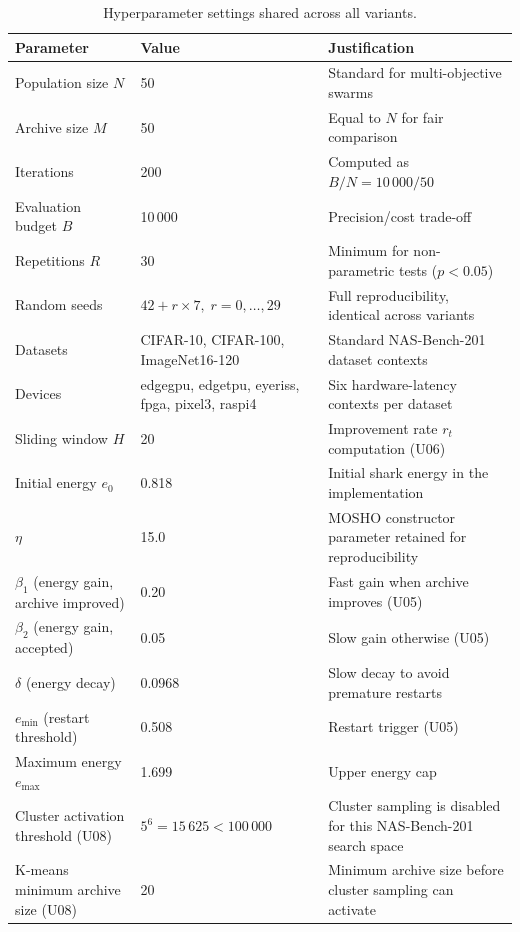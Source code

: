 \documentclass[11pt,a4paper]{article}
\begin{document}
\begin{table}[H]
\centering
\caption{Hyperparameter settings shared across all variants.}
\label{tab:params}
\renewcommand{\arraystretch}{1.2}
\begin{tabularx}{\linewidth}{l l X}
\toprule
\textbf{Parameter} & \textbf{Value} & \textbf{Justification} \\
\midrule
Population size $N$           & 50
  & Standard for multi-objective swarms \\
Archive size $M$              & 50
  & Equal to $N$ for fair comparison \\
Iterations                    & 200
  & Computed as $B/N = 10\,000/50$ \\
Evaluation budget $B$         & 10\,000
  & Precision/cost trade-off \\
Repetitions $R$               & 30
  & Minimum for non-parametric tests ($p < 0.05$) \\
Random seeds & $42 + r \times 7,\; r=0,\dots,29$
  & Full reproducibility, identical across variants \\
Datasets & CIFAR-10, CIFAR-100, ImageNet16-120
  & Standard NAS-Bench-201 dataset contexts \\
Devices & edgegpu, edgetpu, eyeriss, fpga, pixel3, raspi4
  & Six hardware-latency contexts per dataset \\
Sliding window $H$            & 20
  & Improvement rate $r_t$ computation (U06) \\
Initial energy $e_0$          & 0.818
  & Initial shark energy in the implementation \\
$\eta$                       & 15.0
  & MOSHO constructor parameter retained for reproducibility \\
$\beta_1$ (energy gain, archive improved) & 0.20
  & Fast gain when archive improves (U05) \\
$\beta_2$ (energy gain, accepted)         & 0.05
  & Slow gain otherwise (U05) \\
$\delta$ (energy decay)       & 0.0968
  & Slow decay to avoid premature restarts \\
$e_{\min}$ (restart threshold)& 0.508
  & Restart trigger (U05) \\
Maximum energy $e_{\max}$     & 1.699
  & Upper energy cap \\
Cluster activation threshold (U08) & $5^6=15\,625 < 100\,000$
  & Cluster sampling is disabled for this NAS-Bench-201 search space \\
K-means minimum archive size (U08) & 20
  & Minimum archive size before cluster sampling can activate \\

\end{tabularx}
\end{table}
\end{document}
